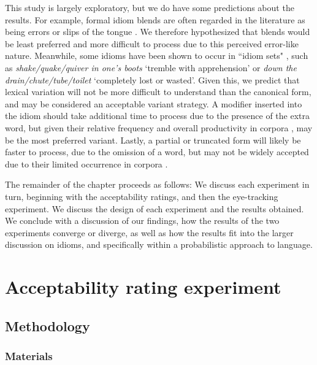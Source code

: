 \documentclass[output=paper
,modfonts
,nonflat]{langsci/langscibook}
\begin{document}
This study is largely exploratory, but we do have some predictions about the results. For example, formal idiom blends are often regarded in the literature as being errors or slips of the tongue \citep{Fay1982, CuttingBock1997}. We therefore hypothesized that blends would be least preferred and more difficult to process due to this perceived error-like nature. Meanwhile, some idioms have been shown to occur in ``idiom sets" \citep{Moon1998}, such as \textit{shake/quake/quiver in one's boots} `tremble with apprehension' or \textit{down the drain/chute/tube/toilet} `completely lost or wasted'. Given this, we predict that lexical variation will not be more difficult to understand than the canonical form, and may be considered an acceptable variant strategy. A modifier inserted into the idiom should take additional time to process due to the presence of the extra word, but given their relative frequency and overall productivity in corpora \citep{Moon1998, Schroder2013}, may be the most preferred variant. Lastly, a partial or truncated form will likely be faster to process, due to the omission of a word, but may not be widely accepted due to their limited occurrence in corpora \citep{Moon1998}.

The remainder of the chapter proceeds as follows: We discuss each experiment in turn, beginning with the acceptability ratings, and then the eye-tracking experiment. We discuss the design of each experiment and the results obtained. We conclude with a discussion of our findings, how the results of the two experiments converge or diverge,  as well as how the results fit into the larger discussion on idioms, and specifically within a probabilistic approach to language.




\section{Acceptability rating experiment}

\subsection{Methodology}
\subsubsection{Materials}
\end{document}
